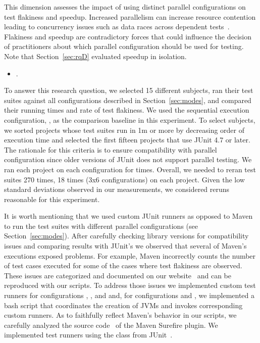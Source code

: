 \documentclass[10pt,journal,compsoc]{IEEEtran}
\begin{document}
This dimension assesses the impact of using distinct parallel
configurations on test flakiness and speedup.  Increased parallelism
can increase resource contention leading to concurrency issues such as
data races across dependent
tests~\cite{luo-etal-fse2014,bell-etal-esecfse2015}.  Flakiness and
speedup are contradictory forces that could influence the decision of
practitioners about which parallel configuration should be used for
testing.  Note that Section~\ref{sec:rqD} evaluated speedup in
isolation.

\begin{itemize}
  \item \numRQIssuesOne{}. \textbf{\RQIssuesOne{}}
\end{itemize}



To answer this research question, we selected 15 different subjects,
ran their test suites against all configurations described in
Section~\ref{sec:modes}, and compared their running times and rate of
test flakiness.  We used the sequential execution configuration,
\emph{\Seq{}}, as the comparison baseline in this experiment.  To
select subjects, we sorted projects whose test suites run in 1m or
more by decreasing order of execution time and selected the first
fifteen projects that use JUnit 4.7 or later.  The rationale for this
criteria is to ensure compatibility with parallel configuration since
older versions of JUnit does not support parallel testing.  We ran
each project on each configuration for \SubjectsReruns{} times.
Overall, we needed to reran test suites 270 times, 18 times (3x6
configurations) on each project.  Given the low standard deviations
observed in our measurements, we considered \SubjectsReruns{} reruns reasonable for this
experiment.

It is worth mentioning that we used custom JUnit runners as opposed to
Maven to run the test suites with different parallel configurations
(see Section~\ref{sec:modes}).  After carefully checking library
versions for compatibility issues and comparing results with JUnit's
we observed that several of Maven's executions exposed problems.  For
example, Maven incorrectly counts the number of test cases executed
for some of the cases where test flakiness are observed. These issues are
categorized and documented on our website~\cite{ourwebpage} and can be
reproduced with our scripts.  To address those issues we implemented
custom test runners for configurations \emph{\SeqClassParMeth{}},
\emph{\ParClassSeqMeth{}}, and \emph{\ParClassParMeth{}} and,  for configurations
\emph{\ForkSeq{}} and \emph{\ForkParMeth{}}, we
implemented a bash script that coordinates the creation of JVMs and
invokes corresponding custom runners.  As to faithfully reflect
Maven's behavior in our scripts, we carefully analyzed the source
code~\cite{maven-surefire-source} of the Maven Surefire plugin. We
implemented test runners using the  class from
JUnit~\cite{junit-parallel}.  
\end{document}
